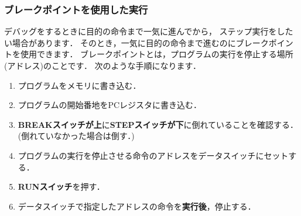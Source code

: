\subsubsection{ブレークポイントを使用した実行}
デバッグをするときに目的の命令まで一気に進んでから，
ステップ実行をしたい場合があります．
そのとき，一気に目的の命令まで進むのにブレークポイントを使用できます．
ブレークポイントとは，プログラムの実行を停止する場所(アドレス)のことです．
次のような手順になります．
\begin{enumerate}
\item プログラムをメモリに書き込む．
\item プログラムの開始番地をPCレジスタに書き込む．
\item {\bf BREAKスイッチが上}に{\bf STEPスイッチが下}に倒れていることを確認する．\\
(倒れていなかった場合は倒す．)
\item プログラムの実行を停止させる命令のアドレスをデータスイッチにセットする．
\item {\bf RUNスイッチ}を押す．
\item データスイッチで指定したアドレスの命令を{\bf 実行後}，停止する．
\end{enumerate}


\begin{center}
\end{center}

